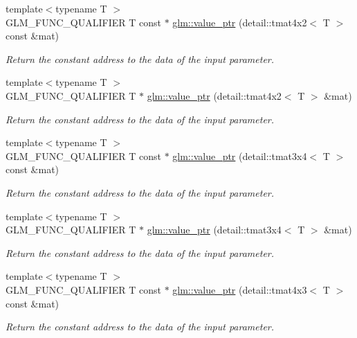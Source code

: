 \begin{DoxyCompactItemize}
{\footnotesize template$<$typename T $>$ }\\G\-L\-M\-\_\-\-F\-U\-N\-C\-\_\-\-Q\-U\-A\-L\-I\-F\-I\-E\-R T const $\ast$ \hyperlink{group__gtc__type__ptr_ga8278dac512c3e2c638b6713d63c728bb}{glm\-::value\-\_\-ptr} (detail\-::tmat4x2$<$ T $>$ const \&mat)
\begin{DoxyCompactList}\small\item\em Return the constant address to the data of the input parameter. \end{DoxyCompactList}\item 
{\footnotesize template$<$typename T $>$ }\\G\-L\-M\-\_\-\-F\-U\-N\-C\-\_\-\-Q\-U\-A\-L\-I\-F\-I\-E\-R T $\ast$ \hyperlink{group__gtc__type__ptr_gab70c3bd4e9be92b0c9b9668744f0b5c8}{glm\-::value\-\_\-ptr} (detail\-::tmat4x2$<$ T $>$ \&mat)
\begin{DoxyCompactList}\small\item\em Return the constant address to the data of the input parameter. \end{DoxyCompactList}\item 
{\footnotesize template$<$typename T $>$ }\\G\-L\-M\-\_\-\-F\-U\-N\-C\-\_\-\-Q\-U\-A\-L\-I\-F\-I\-E\-R T const $\ast$ \hyperlink{group__gtc__type__ptr_gaa38c5a2be6c64a69e7e5d64b70137e1c}{glm\-::value\-\_\-ptr} (detail\-::tmat3x4$<$ T $>$ const \&mat)
\begin{DoxyCompactList}\small\item\em Return the constant address to the data of the input parameter. \end{DoxyCompactList}\item 
{\footnotesize template$<$typename T $>$ }\\G\-L\-M\-\_\-\-F\-U\-N\-C\-\_\-\-Q\-U\-A\-L\-I\-F\-I\-E\-R T $\ast$ \hyperlink{group__gtc__type__ptr_ga7a9cf1d2fb02f56ba01e27ad528aac7d}{glm\-::value\-\_\-ptr} (detail\-::tmat3x4$<$ T $>$ \&mat)
\begin{DoxyCompactList}\small\item\em Return the constant address to the data of the input parameter. \end{DoxyCompactList}\item 
{\footnotesize template$<$typename T $>$ }\\G\-L\-M\-\_\-\-F\-U\-N\-C\-\_\-\-Q\-U\-A\-L\-I\-F\-I\-E\-R T const $\ast$ \hyperlink{group__gtc__type__ptr_gacca7d201301551a24dbf7eef343a14c1}{glm\-::value\-\_\-ptr} (detail\-::tmat4x3$<$ T $>$ const \&mat)
\begin{DoxyCompactList}\small\item\em Return the constant address to the data of the input parameter. \end{DoxyCompactList}\item 

\end{DoxyCompactItemize}
